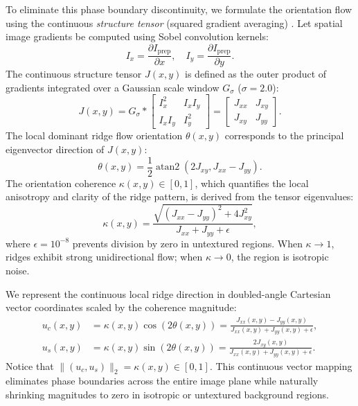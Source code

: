 \documentclass[lettersize,journal]{IEEEtran}
\begin{document}
To eliminate this phase boundary discontinuity, we formulate the orientation flow using the continuous \textit{structure tensor} (squared gradient averaging) \cite{b1}. Let spatial image gradients be computed using Sobel convolution kernels:
\begin{equation}
    I_x = \frac{\partial I_{\text{prep}}}{\partial x}, \quad I_y = \frac{\partial I_{\text{prep}}}{\partial y}.
\end{equation}
The continuous structure tensor $J(x, y)$ is defined as the outer product of gradients integrated over a Gaussian scale window $G_\sigma$ ($\sigma = 2.0$):
\begin{equation}
    J(x, y) = G_\sigma * \begin{bmatrix} I_x^2 & I_x I_y \\ I_x I_y & I_y^2 \end{bmatrix} = \begin{bmatrix} J_{xx} & J_{xy} \\ J_{xy} & J_{yy} \end{bmatrix}.
\end{equation}
The local dominant ridge flow orientation $\theta(x, y)$ corresponds to the principal eigenvector direction of $J(x, y)$:
\begin{equation}
    \theta(x, y) = \frac{1}{2} \operatorname{atan2}(2J_{xy}, J_{xx} - J_{yy}).
\end{equation}
The orientation coherence $\kappa(x, y) \in [0, 1]$, which quantifies the local anisotropy and clarity of the ridge pattern, is derived from the tensor eigenvalues:
\begin{equation}
    \kappa(x, y) = \frac{\sqrt{(J_{xx} - J_{yy})^2 + 4J_{xy}^2}}{J_{xx} + J_{yy} + \epsilon},
\end{equation}
where $\epsilon = 10^{-8}$ prevents division by zero in untextured regions. When $\kappa \to 1$, ridges exhibit strong unidirectional flow; when $\kappa \to 0$, the region is isotropic noise.

We represent the continuous local ridge direction in doubled-angle Cartesian vector coordinates scaled by the coherence magnitude:
\begin{align}
    u_c(x, y) &= \kappa(x, y) \cos(2\theta(x, y)) = \frac{J_{xx}(x, y) - J_{yy}(x, y)}{J_{xx}(x, y) + J_{yy}(x, y) + \epsilon}, \label{eq:uc_def} \\
    u_s(x, y) &= \kappa(x, y) \sin(2\theta(x, y)) = \frac{2J_{xy}(x, y)}{J_{xx}(x, y) + J_{yy}(x, y) + \epsilon}. \label{eq:us_def}
\end{align}
Notice that $\|(u_c, u_s)\|_2 = \kappa(x, y) \in [0, 1]$. This continuous vector mapping eliminates phase boundaries across the entire image plane while naturally shrinking magnitudes to zero in isotropic or untextured background regions.
\end{document}
